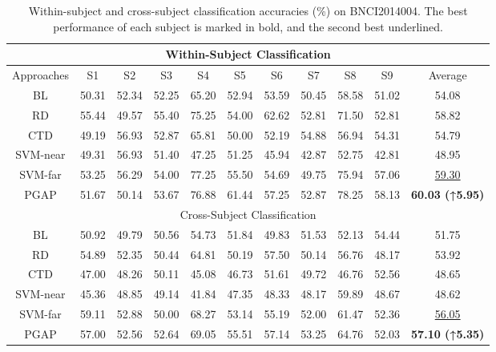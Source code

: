 \documentclass[journal,twocolumn]{IEEEtran}
\begin{document}
\begin{table}[htpb] \centering
  \caption{Within-subject and cross-subject classification accuracies (\%) on BNCI2014004. The best performance of each subject is marked in bold, and the second best underlined.}
  \label{tab:2014004-result}
  \begin{tabular}{c|c|c|c|c|c|c|c|c|c|c}
  \toprule
  \multicolumn{11}{c}{Within-Subject Classification} \\
  \midrule
  Approaches & S1 & S2 & S3 & S4 & S5 & S6 & S7 & S8 & S9 & Average \\
  \midrule
  BL & 50.31 & 52.34 & 52.25 & 65.20 & 52.94 & 53.59 & 50.45 & 58.58 & 51.02 & 54.08 \\
  RD & 55.44 & 49.57 & 55.40 & 75.25 & 54.00 & 62.62 & 52.81 & 71.50 & 52.81 & 58.82 \\
  CTD & 49.19 & 56.93 & 52.87 & 65.81 & 50.00 & 52.19 & 54.88 & 56.94 & 54.31 & 54.79 \\
  SVM-near & 49.31 & 56.93 & 51.40 & 47.25 & 51.25 & 45.94 & 42.87 & 52.75 & 42.81 & 48.95 \\
  SVM-far & 53.25 & 56.29 & 54.00 & 77.25 & 55.50 & 54.69 & 49.75 & 75.94 & 57.06 & \underline{59.30} \\
  PGAP & 51.67 & 50.14 & 53.67 & 76.88 & 61.44 & 57.25 & 52.87 & 78.25 & 58.13 & \textbf{60.03 (↑5.95)} \\
  \midrule
  \multicolumn{11}{c}{Cross-Subject Classification} \\
  \midrule
  BL & 50.92 & 49.79 & 50.56 & 54.73 & 51.84 & 49.83 & 51.53 & 52.13 & 54.44 & 51.75 \\
  RD & 54.89 & 52.35 & 50.44 & 64.81 & 50.19 & 57.50 & 50.14 & 56.76 & 48.17 & 53.92 \\
  CTD & 47.00 & 48.26 & 50.11 & 45.08 & 46.73 & 51.61 & 49.72 & 46.76 & 52.56 & 48.65 \\
  SVM-near & 45.36 & 48.85 & 49.14 & 41.84 & 47.35 & 48.33 & 48.17 & 59.89 & 48.67 & 48.62 \\
  SVM-far & 59.11 & 52.88 & 50.00 & 68.27 & 53.14 & 55.19 & 52.00 & 61.47 & 52.36 & \underline{56.05} \\
  PGAP & 57.00 & 52.56 & 52.64 & 69.05 & 55.51 & 57.14 & 53.25 & 64.76 & 52.03 & \textbf{57.10 (↑5.35)} \\
  \bottomrule
  \end{tabular}
\end{table}
\end{document}
